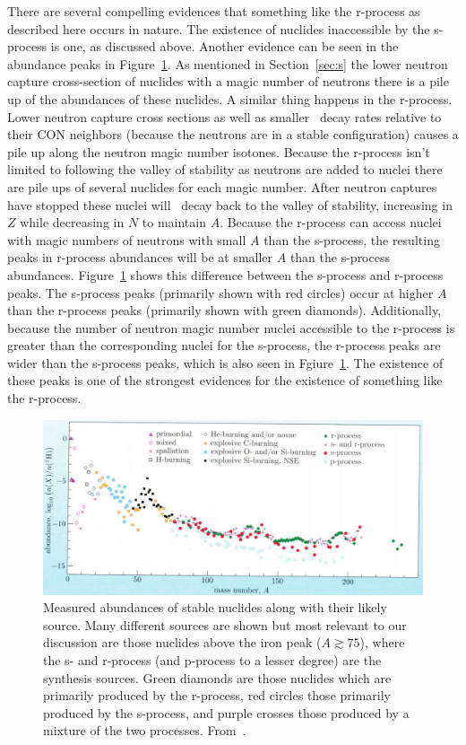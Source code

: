 { There are several compelling evidences that something like the
 r-process as described here occurs in nature.  The existence of
 nuclides inaccessible by the s-process is one, as discussed above.  
Another evidence  can be seen in
the abundance peaks in Figure~\ref{fig:peaks}.  As
mentioned in Section~\ref{sec:s} 
the lower neutron capture cross-section of nuclides with a magic
number of neutrons there is a pile up of the abundances of these
nuclides.   A similar thing happens in the r-process.  Lower neutron
 capture cross sections as well as smaller \bminus\ decay rates
 relative to their CON neighbors
 (because the neutrons are in a stable configuration) causes a pile up
 along the neutron magic number isotones. Because the r-process isn't limited to
 following the valley of stability as neutrons are added to nuclei
 there are pile ups of several nuclides for each magic number.  After
 neutron captures have stopped these nuclei will \bminus\ decay back
 to the valley of stability, increasing in $Z$ while decreasing in $N$
 to maintain $A$.  Because the r-process can access nuclei with magic
 numbers of neutrons with small $A$ than the s-process, the resulting
 peaks in r-process abundances will be at smaller $A$ than the
 s-process abundances. Figure~\ref{fig:peaks} shows this difference
 between the s-process and r-process peaks.  The s-process peaks
 (primarily shown with red circles)  occur at
 higher $A$ than the r-process peaks (primarily shown with green
 diamonds).  
Additionally, because the number of neutron magic
number nuclei accessible to the r-process is greater than the
corresponding nuclei for the s-process, the r-process peaks are wider
than the s-process peaks, which is also seen in
 Fgiure~\ref{fig:peaks}.  
The existence of these peaks is one of the
strongest evidences for the existence of something like the r-process.
\begin{figure}
\centering
\includegraphics[width=6in]{pdf/peaks.png}
\caption{\label{fig:peaks} Measured abundances of stable nuclides
 along with their likely source.  Many different sources are shown but
 most relevant to our discussion are those nuclides above the iron
 peak
 ($A\gtrsim75$),
 where the s- and r-process (and p-process to a lesser degree) are the
 synthesis sources.  Green diamonds are those nuclides which are
 primarily produced by the r-process, red circles those primarily
 produced by the s-process, and purple crosses those produced by a
 mixture of the two processes.  From~\cite{ryan2010}.}
\end{figure}

}
